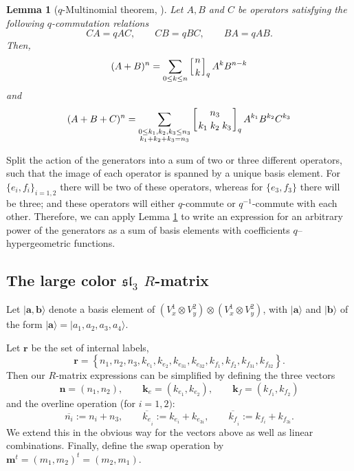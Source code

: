 \documentclass[12pt,oneside,reqno]{amsart}
\newtheorem{lema}{\bf Lemma}
\numberwithin{teorema}{section}
\numberwithin{definicion}{section}
\numberwithin{lema}{section}
\numberwithin{conjetura}{section}
\numberwithin{proposicion}{section}
\def\sl{\mathfrak{sl}}
\newcommand{\qbinom}[2]{\left[\genfrac{}{}{0pt}{}{#1}{#2}\right]_q}
\begin{document}
\begin{lema}[$q$-Multinomial theorem, \cite{Foata-Han}]\label{lemma:operators-q-commute}
Let $A, B$ and $C$ be operators satisfying the following $q$-commutation relations
\begin{equation*}
    CA=q AC, \hspace{2em } CB = q BC, \hspace{2em} BA = q AB.
\end{equation*}
Then,
\begin{equation}
    (A+B)^n= \sum_{0\leq k \leq n} \qbinom{n}{k} A^k B^{n-k}
\end{equation}
and
\begin{equation}
    (A+B+C)^n = \sum_{\substack{0\leq k_1,k_2,k_3 \leq n_3 \\ k_1+k_2+k_3=n_3}} \qbinom{n_3}{k_1\;k_2\;k_3} A^{k_1} B^{k_2} C^{k_3} 
\end{equation}
\end{lema}

Split the action of the generators into a sum of two or three different operators, such that the image of each operator is spanned by a unique basis element. For $\{e_i,f_i\}_{i=1,2}$ there will be two of these operators, whereas for $\{e_3,f_3\}$ there will be three; and these operators will either $q$-commute or $q^{-1}$-commute with each other. Therefore, we can apply Lemma \ref{lemma:operators-q-commute} to write an expression for an arbitrary power of the generators as a sum of basis elements with coefficients $q$--hypergeometric functions.

\subsection{\texorpdfstring{The large color $\sl_3$ $R$-matrix}{The large color sl3 R-matrix}}

Let $|\textbf{a},\textbf{b}\rangle$ denote a basis element of $\left(V_x^1\otimes V_y^2\right)\otimes\left(V_x^1\otimes V_y^2\right)$, with $|\textbf{a}\rangle$ and $|\textbf{b}\rangle$ of the form $|\textbf{a}\rangle=|a_1,a_2,a_3,a_4\rangle$.

Let $\textbf{r}$ be the set of internal labels,
\begin{equation*}
    \textbf{r}=\left\{n_1,n_2,n_3,k_{e_{1}},k_{e_{2}},k_{e_{31}},k_{e_{32}},k_{f_{1}},k_{f_{2}},k_{f_{31}},k_{f_{32}}\right\}.
\end{equation*}
Then our $R$-matrix expressions can be simplified by defining the three vectors
\begin{equation*}
    \textbf{n} = (n_1,n_2), \qquad \textbf{k}_e = (k_{e_{1}},k_{e_{2}}), \qquad \textbf{k}_f =(k_{f_{1}},k_{f_{2}})
\end{equation*}
and the overline operation (for $i = 1, 2)$:
\begin{equation*}
    \overline{n_i} := n_i+n_3, \qquad \overline{k_e}_{{}_i} := k_{e_i}+k_{e_{3i}}, \qquad \overline{k_f}_{{}_i} := k_{f_i}+k_{f_{3i}}.
\end{equation*}
We extend this in the obvious way for the vectors above as well as linear combinations. Finally, define the swap operation by $\textbf{m}^t=(m_1,m_2)^t=(m_2,m_1)$.
\end{document}
